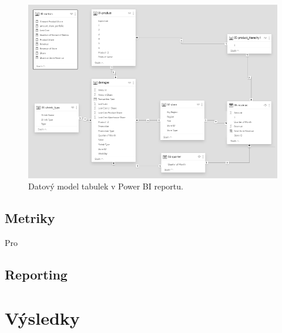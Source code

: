 \begin{figure}[hbtp!]
    \centering
    \captionsetup{justification=centering}
    \includegraphics[width=\textwidth]{obrazky/PBI/datmodel.png}
    \caption{Datový model tabulek v Power BI reportu.}
    \label{obr:datmod}
\end{figure}

\subsection{Metriky}

Pro 

\subsection{Reporting}


\section{Výsledky}
\label{sec:vizualizace:vysl}
